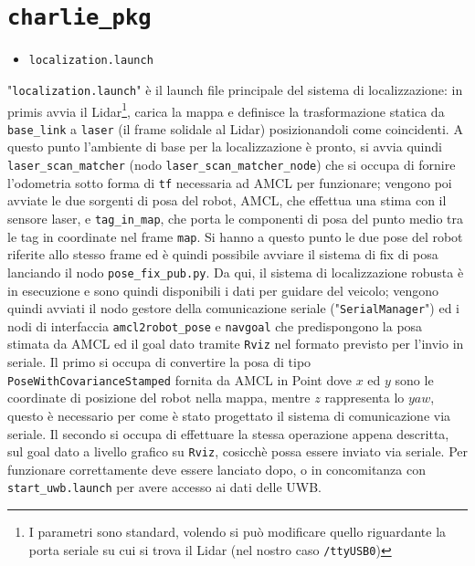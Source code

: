 \section*{\texttt{charlie\_pkg}}
\begin{itemize}
    \item \verb!localization.launch!
\end{itemize}

"\verb!localization.launch!" è il launch file principale del sistema di localizzazione: in primis avvia il Lidar\footnote{I parametri sono standard, volendo si può modificare quello riguardante la porta seriale su cui si trova il Lidar (nel nostro caso \texttt{/ttyUSB0})}, carica la mappa e definisce la trasformazione statica da \verb!base_link! a \verb!laser! (il frame solidale al Lidar) posizionandoli come coincidenti. A questo punto l'ambiente di base per la localizzazione è pronto, si avvia quindi \verb!laser_scan_matcher! (nodo \verb!laser_scan_matcher_node!) che si occupa di fornire l’odometria sotto forma di \verb!tf! necessaria ad AMCL per funzionare; vengono poi avviate le due sorgenti di posa del robot, AMCL, che effettua una stima con il sensore laser, e \verb!tag_in_map!, che porta le componenti di posa del punto medio tra le tag in coordinate nel frame \verb!map!. Si hanno a questo punto le due pose del robot riferite allo stesso frame ed è quindi possibile avviare il sistema di fix di posa lanciando il nodo \verb!pose_fix_pub.py!. Da qui, il sistema di localizzazione robusta è in esecuzione e sono quindi disponibili i dati per guidare del veicolo; vengono quindi avviati il nodo gestore della comunicazione seriale ("\verb!SerialManager!") ed i nodi di interfaccia \verb!amcl2robot_pose! e \verb!navgoal! che predispongono la posa stimata da AMCL ed il goal dato tramite \verb!Rviz! nel formato previsto per l'invio in seriale. Il primo si occupa di convertire la posa di tipo \verb!PoseWithCovarianceStamped! fornita da AMCL in Point dove $x$ ed $y$ sono le coordinate di posizione del robot nella mappa, mentre $z$ rappresenta lo $yaw$, questo è necessario per come è stato progettato il sistema di comunicazione via seriale. Il secondo si occupa di effettuare la stessa operazione appena descritta, sul goal dato a livello grafico su \verb!Rviz!, cosicchè possa essere inviato via seriale.
Per funzionare correttamente deve essere lanciato dopo, o in concomitanza con \verb!start_uwb.launch! per avere accesso ai dati delle UWB.

